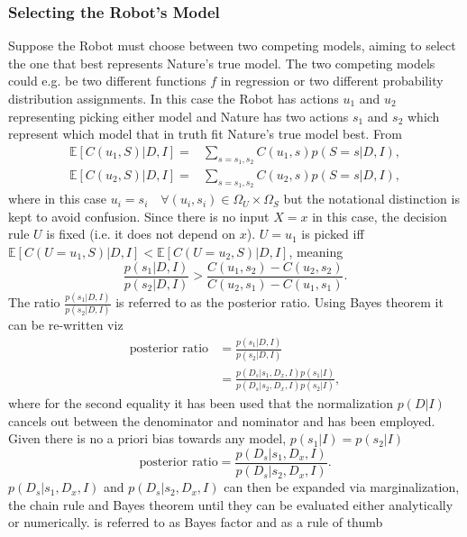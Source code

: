 \subsubsection{Selecting the Robot's Model}
\label{sec:model_selection}
Suppose the Robot must choose between two competing models, aiming to select the one that best represents Nature's true model. The two competing models could e.g. be two different functions $f$ in regression or two different probability distribution assignments. In this case the Robot has actions $u_1$ and $u_2$ representing picking either model and Nature has two actions $s_1$ and $s_2$ which represent which model that in truth fit Nature's true model best. From 
\begin{equation}
	\begin{split}
		\mathbb{E}[C(u_1, S)|D,I] =&  \sum_{s = s_1,s_2}C(u_1,s)p(S=s|D,I),\\
		\mathbb{E}[C(u_2, S)|D,I] =&  \sum_{s = s_1,s_2}C(u_2,s)p(S=s|D,I),
	\end{split}
\end{equation}
where in this case $u_i=s_i\quad \forall (u_i,s_i)\in \Omega_U\times\Omega_S$ but the notational distinction is kept to avoid confusion. Since there is no input $X=x$ in this case, the decision rule $U$ is fixed (i.e. it does not depend on $x$). $U = u_1$ is picked iff $\mathbb{E}[C(U = u_1, S)|D,I]<\mathbb{E}[C(U = u_2, S)|D,I]$, meaning
\begin{equation}
	\frac{p(s_1|D,I)}{p(s_2|D,I)}>\frac{C(u_1,s_2)-C(u_2,s_2)}{C(u_2,s_1)-C(u_1,s_1)}.
\end{equation}
The ratio $\frac{p(s_1|D,I)}{p(s_2|D,I)}$ is referred to as the posterior ratio. Using Bayes theorem it can be re-written viz
\begin{equation}
	\begin{split}
		\text{posterior ratio} &= \frac{p(s_1|D,I)}{p(s_2|D,I)}\\
		& = \frac{p(D_s|s_1,D_x,I)p(s_1|I)}{p(D_s|s_2,D_x,I)p(s_2|I)},
	\end{split}
\end{equation}
where for the second equality it has been used that the normalization $p(D|I)$ cancels out between the denominator and nominator and  has been employed. Given there is no a priori bias towards any model, $p(s_1|I) = p(s_2|I)$
\begin{equation}
	\text{posterior ratio} = \frac{p(D_s|s_1,D_x,I)}{p(D_s|s_2,D_x,I)}.
	\label{eq:bayes_factor}
\end{equation}
$p(D_s|s_1,D_x,I)$ and $p(D_s|s_2,D_x,I)$ can then be expanded via marginalization, the chain rule and Bayes theorem until they can be evaluated either analytically or numerically.  is referred to as Bayes factor and as a rule of thumb

